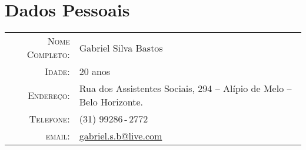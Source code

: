 \documentclass[a4paper,10pt]{article}
\renewcommand\#{\protect\scalebox{0.8}{\protect\raisebox{0.4ex}{\char"0023}}}
\begin{document}
\pagestyle{empty} %

\par{
  \bigskip
  \par
}

\section{Dados Pessoais}

\begin{tabular}{rl}
  \textsc{Nome Completo:} & Gabriel Silva Bastos \\
  \textsc{Idade:}         & 20 anos \\
  \textsc{Endereço:}      & Rua dos Assistentes Sociais, 294 -- Alípio de Melo -- Belo Horizonte. \\
  \textsc{Telefone:}      & (31) 99286\,-\,2772 \\
  \textsc{email:}         & \href{mailto:gabriel.s.b@live.com}{gabriel.s.b@live.com}
\end{tabular}
\end{document}
